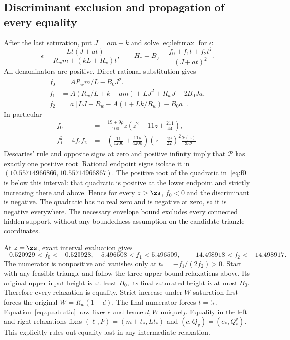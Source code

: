 \subsection{Discriminant exclusion and propagation of every equality}
After the last saturation, put $J=am+k$ and solve
\eqref{eq:leftmax} for $\epsilon$:
\begin{equation}
 \epsilon=\frac{Lt(J+at)}{R_wm+(kL+R_w)t},\qquad
 H_*-B_0=\frac{f_0+f_1t+f_2t^2}{(J+at)^2}.\label{eq:quadratic}
\end{equation}
All denominators are positive. Direct rational substitution gives
\begin{align}
 f_0&=AR_wm/L-B_0J^2,\\
 f_1&=A(R_w/L+k-am)+LJ^2+R_wJ-2B_0Ja,\\
 f_2&=a[LJ+R_w-A(1+Lk/R_w)-B_0a].\label{eq:fcoeff}
\end{align}
In particular
\begin{align}
 f_0&=-\frac{19+9\rho}{100}z\left(z^2-11z+\frac{211}{44}\right),\label{eq:f0}\\
 f_1^2-4f_0f_2
 &=-\left(\frac{11}{1200}+\frac{11\rho}{4200}\right)
 \left(z+\frac{19}{22}\right)^2\frac{\mathcal P(z)}{352}.
 \label{eq:discriminant}
\end{align}
Descartes' rule and opposite signs at zero and positive infinity imply
that $\mathcal P$ has exactly one positive root. Rational endpoint signs
isolate it in $(10.55714966866,10.55714966867)$. The positive root of the
quadratic in~\eqref{eq:f0} is below this interval: that quadratic is
positive at the lower endpoint and strictly increasing there and
above. Hence for every $z>\zs$, $f_0<0$ and the discriminant is negative.
The quadratic has no real zero and is negative at zero, so it is
negative everywhere. The necessary envelope bound excludes every
connected hidden support, without any boundedness assumption on the
candidate triangle coordinates.

At $z=\zs$, exact interval evaluation gives
\begin{equation}
 -0.520929<f_0<-0.520928,\quad
 5.496508<f_1<5.496509,\quad
 -14.498918<f_2<-14.498917.
\end{equation}
The numerator is nonpositive and vanishes only at
$t_*=-f_1/(2f_2)>0$. Start with any feasible triangle and follow the
three upper-bound relaxations above. Its original upper input height is
at least $B_0$; its final saturated height is at most $B_0$. Therefore
every relaxation is equality. Strict increase under $W$ saturation
first forces the original $W=R_w(1-d)$. The final numerator forces
$t=t_*$. Equation~\eqref{eq:quadratic} now fixes $\epsilon$ and hence
$d,W$ uniquely. Equality in the left and right relaxations fixes
$(\ell,P)=(m+t_*,Lt_*)$ and $(c,Q_v)=(c_*,Q_*^v)$.
This explicitly rules out equality lost in any intermediate relaxation.

